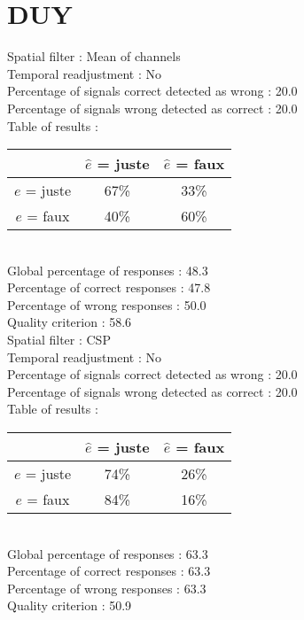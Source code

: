 \section*{DUY}
Spatial filter : Mean of channels \\
Temporal readjustment : No \\
Percentage of signals correct detected as wrong :   20.0 \\
Percentage of signals wrong detected as correct :   20.0 \\
Table of results : \\
\begin{tabular}{|c|c|c|}
\hline				& $\hat{e}$ = juste & $\hat{e}$ = faux \\
\hline  $e$ = juste	&     67\%			&     33\%		\\
\hline  $e$ = faux	&     40\%			&     60\%		\\
\hline
\end{tabular}\\
Global percentage of responses :   48.3 \\
Percentage of correct responses :   47.8 \\
Percentage of wrong responses :   50.0 \\
Quality criterion :   58.6 \\

Spatial filter : CSP \\
Temporal readjustment : No \\
Percentage of signals correct detected as wrong :   20.0 \\
Percentage of signals wrong detected as correct :   20.0 \\
Table of results : \\
\begin{tabular}{|c|c|c|}
\hline				& $\hat{e}$ = juste & $\hat{e}$ = faux \\
\hline  $e$ = juste	&     74\%			&     26\%		\\
\hline  $e$ = faux	&     84\%			&     16\%		\\
\hline
\end{tabular}\\
Global percentage of responses :   63.3 \\
Percentage of correct responses :   63.3 \\
Percentage of wrong responses :   63.3 \\
Quality criterion :   50.9 \\

